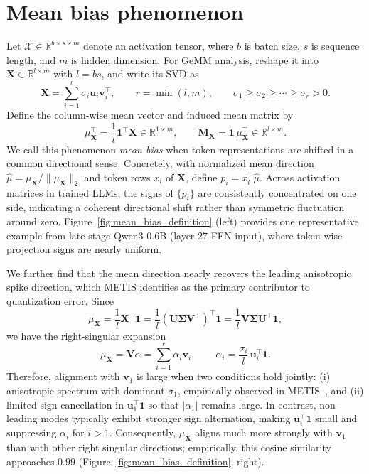 \section{Mean bias phenomenon}

Let $\mathcal{X} \in \mathbb{R}^{b\times s\times m}$ denote an activation tensor, where $b$ is batch size, $s$ is sequence length, and $m$ is hidden dimension. For GeMM analysis, reshape it into $\mathbf{X} \in \mathbb{R}^{l\times m}$ with $l=bs$, and write its SVD as
\[
\mathbf{X}=\sum_{i=1}^{r}\sigma_i\mathbf{u}_i\mathbf{v}_i^\top,
\qquad r=\min(l,m),
\qquad \sigma_1\ge\sigma_2\ge\cdots\ge\sigma_r>0.
\]
Define the column-wise mean vector and induced mean matrix by
\[
\mu_{\mathbf{X}}^\top=\frac{1}{l}\mathbf{1}^\top\mathbf{X}\in\mathbb{R}^{1\times m},
\qquad
\mathbf{M}_{\mathbf{X}}=\mathbf{1}\,\mu_{\mathbf{X}}^\top\in\mathbb{R}^{l\times m}.
\]
We call this phenomenon \emph{mean bias} when token representations are shifted in a common directional sense. Concretely, with normalized mean direction $\hat\mu=\mu_{\mathbf{X}}/\|\mu_{\mathbf{X}}\|_2$ and token rows $x_i$ of $\mathbf{X}$, define $p_i = x_i^\top\hat\mu.$
Across activation matrices in trained LLMs, the signs of $\{p_i\}$ are consistently concentrated on one side, indicating a coherent directional shift rather than symmetric fluctuation around zero. Figure~\ref{fig:mean_bias_definition} (left) provides one representative example from late-stage Qwen3-0.6B (layer-27 FFN input), where token-wise projection signs are nearly uniform.

We further find that the mean direction nearly recovers the leading anisotropic spike direction, which METIS identifies as the primary contributor to quantization error. Since
\[
\mu_{\mathbf{X}}=\frac{1}{l}\mathbf{X}^\top\mathbf{1}
=\frac{1}{l}(\mathbf{U}\mathbf{\Sigma}\mathbf{V}^\top)^\top\mathbf{1}
=\frac{1}{l}\mathbf{V}\mathbf{\Sigma}\mathbf{U}^\top\mathbf{1},
\]
we have the right-singular expansion
\[
\mu_{\mathbf{X}}=\mathbf{V}\alpha=\sum_{i=1}^{r}\alpha_i\mathbf{v}_i,
\qquad
\alpha_i=\frac{\sigma_i}{l}\,\mathbf{u}_i^\top\mathbf{1}.
\]
Therefore, alignment with $\mathbf{v}_1$ is large when two conditions hold jointly: (i) anisotropic spectrum with dominant $\sigma_1$, empirically observed in METIS~\citep{cao2025metis}, and (ii) limited sign cancellation in $\mathbf{u}_1^\top\mathbf{1}$ so that $|\alpha_1|$ remains large. In contrast, non-leading modes typically exhibit stronger sign alternation, making $\mathbf{u}_i^\top\mathbf{1}$ small and suppressing $\alpha_i$ for $i>1$. Consequently, $\mu_{\mathbf{X}}$ aligns much more strongly with $\mathbf{v}_1$ than with other right singular directions; empirically, this cosine similarity approaches $0.99$ (Figure~\ref{fig:mean_bias_definition}, right).

